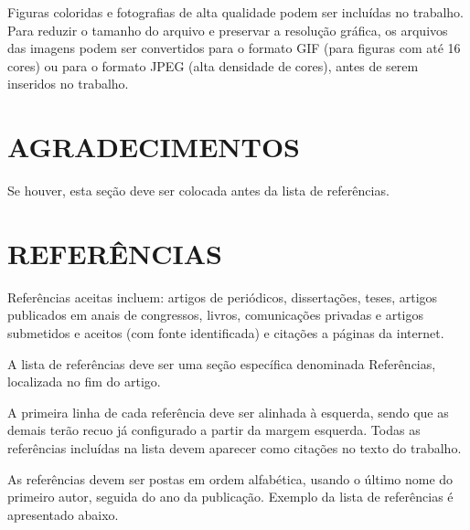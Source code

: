 \documentclass[10pt,fleqn,a4paper,twoside]{article}
\begin{document}
        Figuras coloridas e fotografias de alta qualidade podem ser incluídas no trabalho. Para reduzir o tamanho do arquivo e preservar a resolução gráfica, os arquivos das imagens podem ser convertidos para o formato GIF (para figuras com até 16 cores) ou para o formato JPEG (alta densidade de cores), antes de serem inseridos no trabalho.

    \section{AGRADECIMENTOS}
    
        Se houver, esta seção deve ser colocada antes da lista de referências.


    \section{REFERÊNCIAS}
    
    
        Referências aceitas incluem: artigos de periódicos, dissertações, teses, artigos publicados em anais de congressos, livros, comunicações privadas e artigos submetidos e aceitos (com fonte identificada) e citações a páginas da internet.

        A lista de referências deve ser uma seção específica denominada Referências, localizada no fim do artigo.

        A primeira linha de cada referência deve ser alinhada à esquerda, sendo que as demais terão recuo já configurado a partir da margem esquerda. Todas as referências incluídas na lista devem aparecer como citações no texto do trabalho.

        As referências devem ser postas em ordem alfabética, usando o último nome do primeiro autor, seguida do ano da publicação. Exemplo da lista de referências é apresentado abaixo.
        
\end{document}
